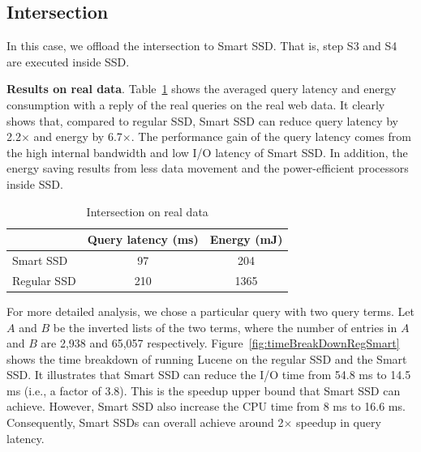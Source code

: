 
\subsection{Intersection}\label{sec:expIntersection}
In this case, we offload the \textsf{intersection} to Smart SSD. That is, step S3 and S4 are executed inside SSD.

\textbf{Results on real data}.
Table~\ref{tab:interRealData} shows the averaged query latency and energy consumption with a reply of the real queries on the real web data. It clearly shows that, compared to regular SSD, Smart SSD can reduce query latency by 2.2$\times$ and energy by 6.7$\times$. The performance gain of the query latency comes from the high internal bandwidth and low I/O latency of Smart SSD. In addition, the energy saving results from less data movement and the power-efficient processors inside SSD.

\begin{table}[tbp]\small
\centering
\begin{tabular}{l|c|c}\hline\hline
& \textbf{Query latency (ms)} & \textbf{Energy (mJ)}\\\hline
Smart SSD & 97 & 204\\\hline
Regular SSD & 210 & 1365 \\\hline\hline
\end{tabular}
\caption{Intersection on real data}\label{tab:interRealData}
\end{table}

For more detailed analysis, we chose a particular query with two query terms. Let $A$ and $B$ be the inverted lists of the two terms, where the number of entries in $A$ and $B$ are 2,938 and 65,057 respectively. Figure~\ref{fig:timeBreakDownRegSmart} shows the time breakdown of running Lucene on the regular SSD and the Smart SSD. It illustrates that Smart SSD can reduce the I/O time from 54.8 ms to	14.5 ms (i.e., a factor of 3.8). This is the speedup upper bound that Smart SSD can achieve. However, Smart SSD also increase the CPU time from 8 ms to 16.6 ms. Consequently, Smart SSDs can overall achieve around 2$\times$ speedup in query latency.

